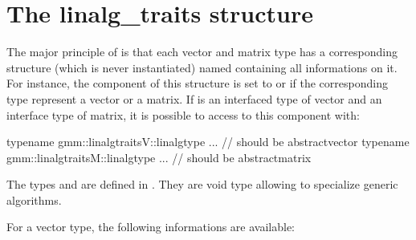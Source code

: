 \documentclass[a4paper,11pt,english]{sphinxmanual}
\begin{document}
\section{The linalg\_traits structure}
\label{\detokenize{gmm/inside:the-linalg-traits-structure}}
The major principle of  is that each vector and matrix type has a corresponding structure (which is never instantiated) named  containing all informations on it. For instance, the component  of this structure is set to  or  if the corresponding type represent a vector or a matrix. If  is an interfaced type of vector and  an interface type of matrix, it is possible to access to this component with:

\begin{sphinxVerbatim}[commandchars=\\\{\}]
typename gmm::linalg\PYGZus{}traits\PYGZlt{}V\PYGZgt{}::linalg\PYGZus{}type ...  // should be abstract\PYGZus{}vector
typename gmm::linalg\PYGZus{}traits\PYGZlt{}M\PYGZgt{}::linalg\PYGZus{}type ...  // should be abstract\PYGZus{}matrix
\end{sphinxVerbatim}

The types  and  are defined in . They are void type allowing to specialize generic algorithms.

For a vector type, the following informations are available:
\end{document}
